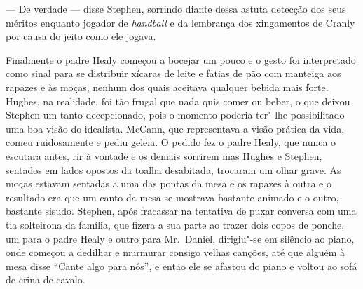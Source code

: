 --- De verdade --- disse Stephen, sorrindo diante dessa astuta detecção dos
seus méritos enquanto jogador de \textit{handball} e da lembrança dos
xingamentos de Cranly por causa do jeito como ele jogava.

Finalmente o padre Healy começou a bocejar um pouco e o gesto foi interpretado
como sinal para se distribuir xícaras de leite e fatias de pão com manteiga aos
rapazes e às moças, nenhum dos quais aceitava qualquer bebida mais forte.
Hughes, na realidade, foi tão frugal que nada quis comer ou beber, o que deixou
Stephen um tanto decepcionado, pois o momento poderia ter"-lhe possibilitado uma
boa visão do idealista.  McCann, que representava a visão prática da vida,
comeu ruidosamente e pediu geleia.  O pedido fez o padre Healy, que nunca o
escutara antes, rir à vontade e os demais sorrirem mas Hughes e Stephen,
sentados em lados opostos da toalha \label{desabitada} desabitada, trocaram um olhar grave.  As
moças estavam sentadas a uma das pontas da mesa e os rapazes à outra e o
resultado era que um canto da mesa se mostrava bastante animado e o outro,
bastante sisudo.  Stephen, após fracassar na tentativa de puxar conversa com
uma tia solteirona da família, que fizera a sua parte ao trazer dois copos de
ponche, um para o padre Healy e outro para Mr.~Daniel, dirigiu"-se em silêncio
ao piano, onde começou a dedilhar e murmurar consigo velhas canções, até que
alguém à mesa disse “Cante algo para nós”, e então ele se afastou do piano e
voltou ao sofá de crina de cavalo.

